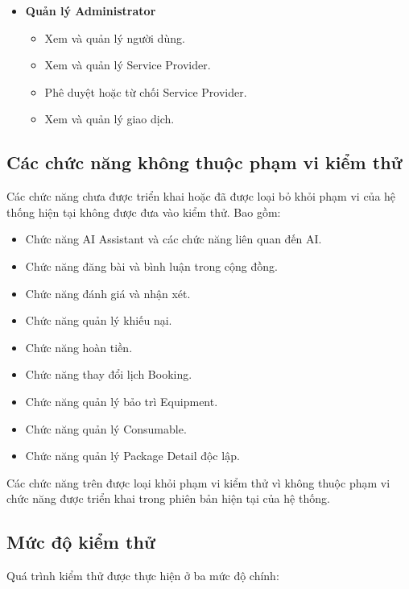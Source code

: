 \begin{itemize}
	\item \textbf{Quản lý Administrator}
	\begin{itemize}
		\item Xem và quản lý người dùng.
		\item Xem và quản lý Service Provider.
		\item Phê duyệt hoặc từ chối Service Provider.
		\item Xem và quản lý giao dịch.
	\end{itemize}
\end{itemize}

\subsection{Các chức năng không thuộc phạm vi kiểm thử}

Các chức năng chưa được triển khai hoặc đã được loại bỏ khỏi phạm vi của hệ thống hiện tại không được đưa vào kiểm thử. Bao gồm:

\begin{itemize}
	\item Chức năng AI Assistant và các chức năng liên quan đến AI.
	\item Chức năng đăng bài và bình luận trong cộng đồng.
	\item Chức năng đánh giá và nhận xét.
	\item Chức năng quản lý khiếu nại.
	\item Chức năng hoàn tiền.
	\item Chức năng thay đổi lịch Booking.
	\item Chức năng quản lý bảo trì Equipment.
	\item Chức năng quản lý Consumable.
	\item Chức năng quản lý Package Detail độc lập.
\end{itemize}

Các chức năng trên được loại khỏi phạm vi kiểm thử vì không thuộc phạm vi chức năng được triển khai trong phiên bản hiện tại của hệ thống.

\subsection{Mức độ kiểm thử}

Quá trình kiểm thử được thực hiện ở ba mức độ chính:

